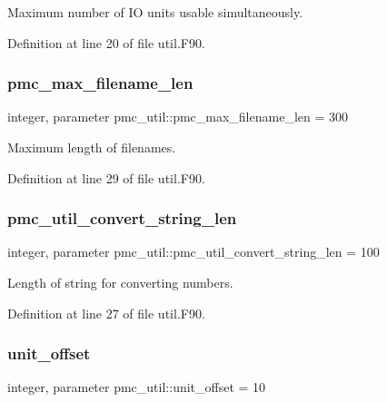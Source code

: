 Maximum number of IO units usable simultaneously. 



Definition at line 20 of file util.\+F90.

\mbox{\label{namespacepmc__util_aca52c78318a6a444ebb5477b532ffeec}} 
\subsubsection{\texorpdfstring{pmc\+\_\+max\+\_\+filename\+\_\+len}{pmc\_max\_filename\_len}}
{\footnotesize\ttfamily integer, parameter pmc\+\_\+util\+::pmc\+\_\+max\+\_\+filename\+\_\+len = 300}



Maximum length of filenames. 



Definition at line 29 of file util.\+F90.

\mbox{\label{namespacepmc__util_afd468d26aef28509c08087ba8e59089a}} 
\subsubsection{\texorpdfstring{pmc\+\_\+util\+\_\+convert\+\_\+string\+\_\+len}{pmc\_util\_convert\_string\_len}}
{\footnotesize\ttfamily integer, parameter pmc\+\_\+util\+::pmc\+\_\+util\+\_\+convert\+\_\+string\+\_\+len = 100}



Length of string for converting numbers. 



Definition at line 27 of file util.\+F90.

\mbox{\label{namespacepmc__util_abd64d09b01c7009bc014bd03950e3318}} 
\subsubsection{\texorpdfstring{unit\+\_\+offset}{unit\_offset}}
{\footnotesize\ttfamily integer, parameter pmc\+\_\+util\+::unit\+\_\+offset = 10}



